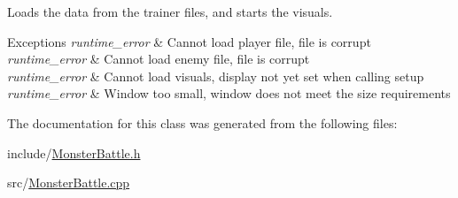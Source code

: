 Loads the data from the trainer files, and starts the visuals. 


\begin{DoxyExceptions}{Exceptions}
{\em runtime\+\_\+error} & Cannot load player file, file is corrupt \\
\hline
{\em runtime\+\_\+error} & Cannot load enemy file, file is corrupt \\
\hline
{\em runtime\+\_\+error} & Cannot load visuals, display not yet set when calling setup \\
\hline
{\em runtime\+\_\+error} & Window too small, window does not meet the size requirements \\
\hline
\end{DoxyExceptions}


The documentation for this class was generated from the following files\+:\begin{DoxyCompactItemize}
\item 
include/\hyperlink{MonsterBattle_8h}{Monster\+Battle.\+h}\item 
src/\hyperlink{MonsterBattle_8cpp}{Monster\+Battle.\+cpp}\end{DoxyCompactItemize}
